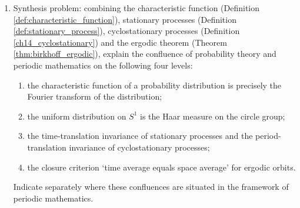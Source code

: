 \begin{enumerate}[leftmargin=3em, label=\textbf{Exercise \arabic*}]
    \item Synthesis problem: combining the characteristic function (Definition \ref{def:characteristic_function}),
    stationary processes (Definition \ref{def:stationary_process}),
    cyclostationary processes (Definition \ref{ch14_cyclostationary})
    and the ergodic theorem (Theorem \ref{thm:birkhoff_ergodic}),
    explain the confluence of probability theory and periodic mathematics on the following four levels:
    \begin{enumerate}[label=(\roman*)]
        \item the characteristic function of a probability distribution is precisely the Fourier transform of the distribution;
        \item the uniform distribution on $S^1$ is the Haar measure on the circle group;
        \item the time-translation invariance of stationary processes and the period-translation invariance of cyclostationary processes;
        \item the closure criterion `time average equals space average' for ergodic orbits.
    \end{enumerate}
    Indicate separately where these confluences are situated in the framework of periodic mathematics.
\end{enumerate}

